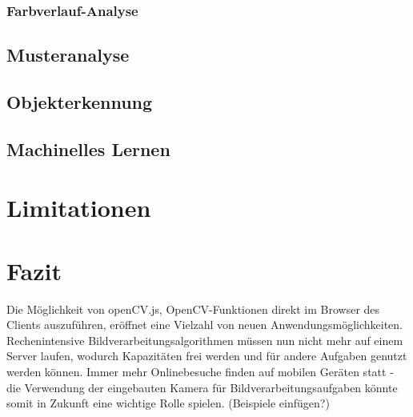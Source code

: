 \documentclass{article}
\begin{document}
\subsubsection{Farbverlauf-Analyse}
\subsection{Musteranalyse}
\subsection{Objekterkennung}
\subsection{Machinelles Lernen}

\section{Limitationen}

\section{Fazit}
Die Möglichkeit von openCV.js, OpenCV-Funktionen direkt im Browser des Clients auszuführen, eröffnet eine Vielzahl von neuen Anwendungsmöglichkeiten. Rechenintensive Bildverarbeitungsalgorithmen müssen nun nicht mehr auf einem Server laufen, wodurch Kapazitäten frei werden und für andere Aufgaben genutzt werden können. Immer mehr Onlinebesuche finden auf mobilen Geräten statt - die Verwendung der eingebauten Kamera für Bildverarbeitungsaufgaben könnte somit in Zukunft eine wichtige Rolle spielen. 
(Beispiele einfügen?)
\end{document}
